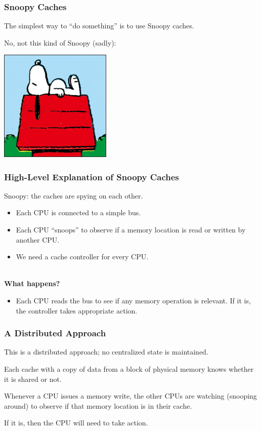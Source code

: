 \begin{frame}
\frametitle{Snoopy Caches}

The simplest way to ``do something''
is to use Snoopy caches. 

No, not this kind of Snoopy (sadly):

\begin{center}
	\includegraphics[width=0.4\textwidth]{images/peanuts-snoopy1.jpg}
\end{center}



\end{frame}

\begin{frame}
  \frametitle{High-Level Explanation of Snoopy Caches}

  Snoopy: the caches are spying on each other.
  
  \begin{itemize}
    \item Each CPU is connected to a simple bus.
    \item Each CPU ``snoops'' to observe if a memory location is read or written
      by another CPU.
    \item We need a cache controller for every CPU.
  \end{itemize}
  ~\\
  {\bf What happens?}

  \begin{itemize}
    \item Each CPU reads the bus to see if any memory operation is relevant. If
      it is, the controller takes appropriate action.
  \end{itemize}
  
\end{frame}

\begin{frame}
\frametitle{A Distributed Approach}


This is a distributed approach; no centralized state is maintained. 

Each cache with a copy of data from a block of physical memory knows whether it is shared or not. 

Whenever a CPU issues a memory write, the other CPUs are watching (snooping around) to observe if that memory location is in their cache. 

If it is, then the CPU will need to take action.

\end{frame}


